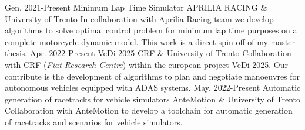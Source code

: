 \documentclass[9pt]{developercv_mattia} %
\begin{document}
%
%
%
%
\begin{entrylist}
	\entry
		{Gen. 2021-Present}
		{Minimum Lap Time Simulator}
		{APRILIA RACING \& University of Trento}
		{In collaboration with Aprilia Racing team we develop algorithms to solve optimal control problem for minimum lap time purposes on a complete motorcycle dynamic model. This work is a direct spin-off of my master thesis.}
	\entry
		{Apr. 2022-Present}
		{VeDi 2025}
		{CRF \& University of Trento}
		{Collaboration with CRF (\textit{Fiat Research Centre}) within the european project VeDi 2025. Our contribute is the development of algorithms to plan and negotiate manoeuvres for autonomous vehicles equipped with ADAS systems. }
	\entry
		{May. 2022-Present}
		{Automatic generation of racetracks for vehicle simulators}
		{AnteMotion \& University of Trento}
		{Collaboration with AnteMotion to develop a toolchain for automatic generation of racetracks and scenarios for vehicle simulators. }
\end{entrylist}
\end{document}
